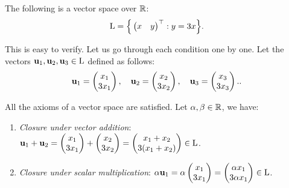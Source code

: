 \begin{example}
	\label{example:simple_vector_space}
	The following is a vector space over $\mathbb{R}$:
	\begin{align*}
		\mathrm{L} = \Big\{ 
			\begin{pmatrix}
				x & y
			\end{pmatrix}^\top: y = 3x 
		 \Big\}.
	\end{align*}

	\noindent This is easy to verify. Let us go through each condition one by one. Let the vectors ${\bf u}_1, {\bf u}_2, {\bf u}_3 \in \mathrm{L}$ defined as follows: 
	\begin{align*}
		{\bf u}_1 = \begin{pmatrix}
			x_1 \\ 3x_1	
		\end{pmatrix}, \quad
		{\bf u}_2 = \begin{pmatrix}
			x_2 \\ 3x_2	
		\end{pmatrix}, \quad 
		{\bf u}_3 = \begin{pmatrix}
			x_3 \\ 3x_3	
		\end{pmatrix}..
	\end{align*} 

	\noindent All the axioms of a vector space are satisfied. Let $\alpha,\beta\in\mathbb{R}$, we have:
	\begin{enumerate}
		\item \emph{Closure under vector addition}: ${\bf u}_1 + {\bf u}_2 = \begin{pmatrix} x_1 \\ 3x_1 \end{pmatrix} + \begin{pmatrix} x_2 \\ 3x_2 \end{pmatrix} = \begin{pmatrix} x_1 + x_2 \\ 3(x_1 + x_2) \end{pmatrix} \in \mathrm{L}$.

		\item \emph{Closure under scalar multiplication}: $\alpha{\bf u}_1 = \alpha \begin{pmatrix} x_1 \\ 3x_1 \end{pmatrix} = \begin{pmatrix} \alpha x_1 \\ 3\alpha x_1 \end{pmatrix} \in \mathrm{L}$. 


\end{enumerate}
\end{example}
